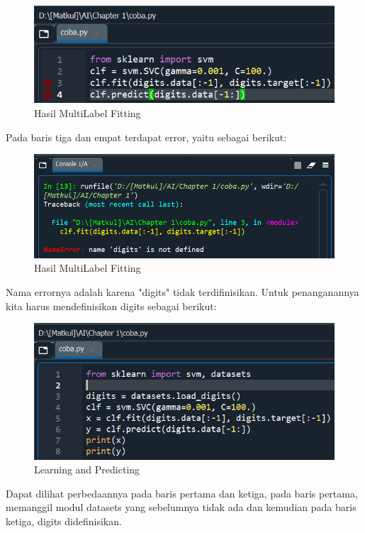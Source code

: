     \begin{figure}[H]
    \centering
    \includegraphics[width=13cm]{figures/chapter1/error/1.PNG}
    \caption{Hasil MultiLabel Fitting}
    \end{figure}

\par Pada baris tiga dan empat terdapat error, yaitu sebagai berikut:

    \begin{figure}[H]
    \centering
    \includegraphics[width=13cm]{figures/chapter1/error/2.PNG}
    \caption{Hasil MultiLabel Fitting}
    \end{figure}

\par Nama errornya adalah karena "digits" tidak terdifinisikan. Untuk penanganannya kita harus mendefinisikan digits sebagai berikut:

    \begin{figure}[H]
    \centering
    \includegraphics[width=13cm]{figures/chapter1/12.PNG}
    \caption{Learning and Predicting}
    \end{figure}

\par Dapat dilihat perbedaannya pada baris pertama dan ketiga, pada baris pertama, memanggil modul datasets yang sebelumnya tidak ada dan kemudian pada baris ketiga, digits didefinisikan.